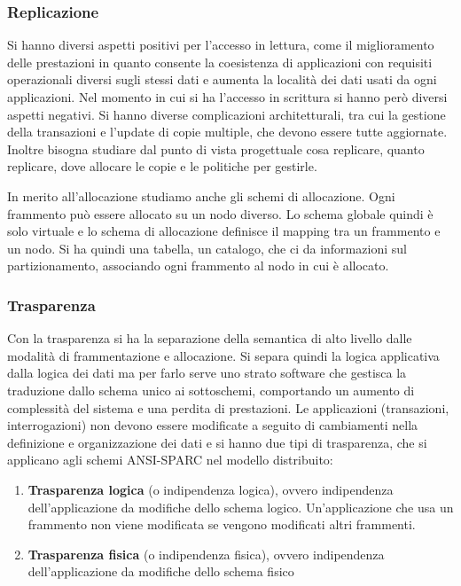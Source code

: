 \subsubsection{Replicazione}
Si hanno diversi aspetti positivi per l'accesso in lettura, come il miglioramento
delle prestazioni in quanto consente la coesistenza di applicazioni con requisiti
operazionali diversi sugli stessi dati e aumenta la località dei dati usati da
ogni applicazioni. Nel momento in cui si ha l'accesso in scrittura si hanno però
diversi aspetti negativi. Si hanno diverse complicazioni architetturali, tra cui
la gestione della transazioni e l'update di copie multiple, che devono essere
tutte aggiornate. Inoltre bisogna studiare dal punto di vista progettuale cosa
replicare, quanto replicare, dove allocare le copie e le politiche per gestirle.

In merito all'allocazione studiamo anche gli schemi di allocazione. Ogni
frammento può essere allocato su un nodo diverso. Lo schema globale quindi
è solo virtuale e lo schema di allocazione definisce il mapping tra un frammento
e un nodo. Si ha quindi una tabella, un catalogo, che ci da informazioni sul
partizionamento, associando ogni frammento al nodo in cui è allocato.
\subsubsection{Trasparenza}
Con la trasparenza si ha la separazione della semantica di alto livello dalle
modalità di frammentazione e allocazione. Si separa quindi la logica applicativa
dalla logica dei dati ma per farlo serve uno strato software che gestisca la
traduzione dallo schema unico ai sottoschemi, comportando un aumento di
complessità del sistema e una perdita di prestazioni.
Le applicazioni (transazioni, interrogazioni) non devono essere modificate a
seguito di cambiamenti nella definizione e organizzazione dei dati e si hanno
due tipi di trasparenza, che si applicano agli schemi ANSI-SPARC nel
modello distribuito:
\begin{enumerate}
    \item \textbf{Trasparenza logica} (o indipendenza logica), ovvero
          indipendenza dell'applicazione da modifiche dello schema logico.
          Un'applicazione che usa un frammento non viene modificata se vengono
          modificati altri frammenti.
    \item \textbf{Trasparenza fisica} (o indipendenza fisica), ovvero
          indipendenza dell'applicazione da modifiche dello schema fisico
\end{enumerate}


